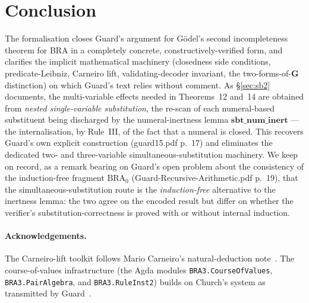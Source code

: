 \documentclass[11pt]{article}
\theoremstyle{plain}
\theoremstyle{definition}
\theoremstyle{remark}
\begin{document}
\section{Conclusion}

The formalisation closes Guard's argument for G\"odel's second
incompleteness theorem for BRA in a completely concrete,
constructively-verified form, and clarifies the implicit mathematical
machinery (closedness side conditions, predicate-Leibniz, Carneiro lift,
validating-decoder invariant, the two-forms-of-$\mathbf{G}$ distinction) on
which Guard's text relies without comment.  As {\S}\ref{sec:sb2} documents,
the multi-variable effects needed in Theorems~12 and~14 are obtained from
\emph{nested single-variable substitution}, the re-scan of each
numeral-based substituent being discharged by the numeral-inertness lemma
$\mathbf{sbt\_num\_inert}$ --- the internalisation, by Rule~III, of the fact
that a numeral is closed.  This recovers Guard's own explicit construction
(guard15.pdf p.~17) and eliminates the dedicated two- and three-variable
simultaneous-substitution machinery.  We keep on record, as a remark bearing
on Guard's open problem about the consistency of the induction-free fragment
$\mathrm{BRA}_0$ (Guard-Recursive-Arithmetic.pdf p.~19), that the simultaneous-substitution
route is the \emph{induction-free} alternative to the inertness lemma: the
two agree on the encoded result but differ on whether the verifier's
substitution-correctness is proved with or without internal induction.

\paragraph{Acknowledgements.}  {\sloppy The Carneiro-lift toolkit
follows Mario Carneiro's natural-deduction note~\cite{Carneiro}.  The
course-of-values infrastructure (the Agda modules
\texttt{BRA3.CourseOfValues}, \texttt{BRA3.PairAlgebra}, and
\texttt{BRA3.RuleInst2}) builds on Church's system as transmitted by
Guard~\cite{Guard1963,Church}.\par}
\end{document}
